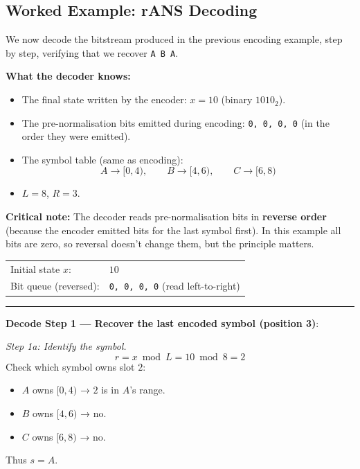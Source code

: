 \subsection{Worked Example: rANS Decoding}

We now decode the bitstream produced in the previous encoding
example, step by step, verifying that we recover \texttt{A B A}.

\begin{examplebox}
\textbf{What the decoder knows:}
\begin{itemize}
  \item The final state written by the encoder: $x = 10$ (binary $1010_2$).
  \item The pre-normalisation bits emitted during encoding:
        \texttt{0, 0, 0, 0} (in the order they were emitted).
  \item The symbol table (same as encoding):
        \[
        A \to [0,4),\qquad B \to [4,6),\qquad C \to [6,8)
        \]
  \item $L = 8$, $R = 3$.
\end{itemize}

\medskip
\textbf{Critical note:} The decoder reads pre-normalisation bits
in \textbf{reverse order} (because the encoder emitted bits for the
last symbol first).  In this example all bits are zero, so reversal
doesn't change them, but the principle matters.

\begin{center}
\begin{tabular}{@{}ll@{}}
  Initial state $x$:  & $10$ \\
  Bit queue (reversed): & \texttt{0, 0, 0, 0} (read left-to-right) \\
\end{tabular}
\end{center}

\medskip\hrule\medskip

\noindent\textbf{Decode Step 1 — Recover the last encoded symbol (position 3)}:

\medskip
\noindent\emph{Step 1a: Identify the symbol.}
\[
r = x \bmod L = 10 \bmod 8 = 2
\]
Check which symbol owns slot $2$:
\begin{itemize}
  \item $A$ owns $[0,4)$ → $2$ is in $A$'s range.
  \item $B$ owns $[4,6)$ → no.
  \item $C$ owns $[6,8)$ → no.
\end{itemize}
Thus $s = A$.


\end{examplebox}

